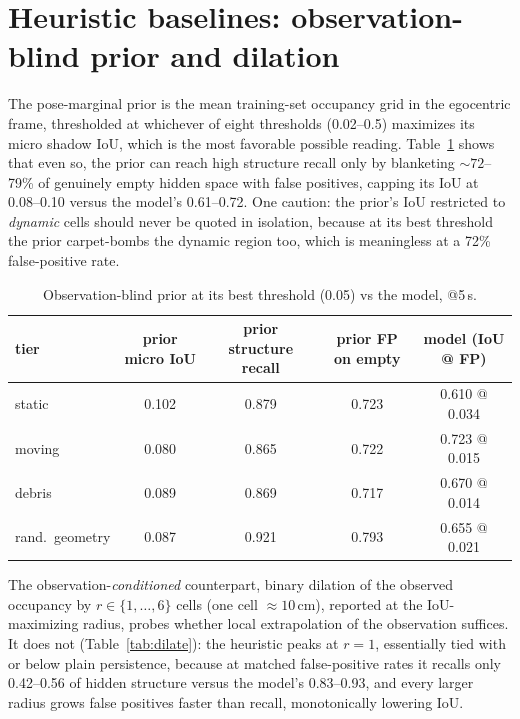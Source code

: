 \documentclass{article}
\begin{document}
\section{Heuristic baselines: observation-blind prior and dilation}
\label{app:prior}

The pose-marginal prior is the mean training-set occupancy grid in the egocentric frame,
thresholded at whichever of eight thresholds (0.02--0.5) maximizes its micro shadow IoU, which is
the most favorable possible reading. Table~\ref{tab:prior} shows that even so, the prior can reach
high structure recall only by blanketing ${\sim}72$--79\% of genuinely empty hidden space with
false positives, capping its IoU at 0.08--0.10 versus the model's 0.61--0.72. One caution: the
prior's IoU restricted to \emph{dynamic} cells should never be quoted in isolation, because at its
best threshold the prior carpet-bombs the dynamic region too, which is meaningless at a
72\% false-positive rate.

\begin{table}[ht]
  \centering
  \small
  \caption{Observation-blind prior at its best threshold (0.05) vs the model, @5\,s.}
  \label{tab:prior}
  \begin{tabular}{lcccc}
    \toprule
    tier & prior micro IoU & prior structure recall & prior FP on empty & model (IoU @ FP) \\
    \midrule
    static & 0.102 & 0.879 & 0.723 & 0.610 @ 0.034 \\
    moving & 0.080 & 0.865 & 0.722 & 0.723 @ 0.015 \\
    debris & 0.089 & 0.869 & 0.717 & 0.670 @ 0.014 \\
    rand.\ geometry & 0.087 & 0.921 & 0.793 & 0.655 @ 0.021 \\
    \bottomrule
  \end{tabular}
\end{table}

The observation-\emph{conditioned} counterpart, binary dilation of the observed occupancy by
$r \in \{1,\dots,6\}$ cells (one cell ${\approx}10$\,cm), reported at the IoU-maximizing radius,
probes whether local extrapolation of the observation suffices. It does not
(Table~\ref{tab:dilate}): the heuristic peaks at $r{=}1$, essentially tied with or below plain
persistence, because at matched false-positive rates it recalls only 0.42--0.56 of hidden
structure versus the model's 0.83--0.93, and every larger radius grows false positives faster
than recall, monotonically lowering IoU.
\end{document}
